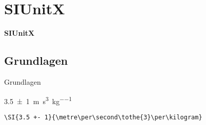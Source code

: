 \documentclass["WS\space 16-17\space -\space LaTeX-Kurs\space -\space Praesentation\space -\space 3.tex"]{subfiles}
\begin{document}
\section{SIUnitX}
\begin{frame}[c]
	\begin{center}
		\LARGE \textbf{SIUnitX}
	\end{center}
\end{frame}
\subsection{Grundlagen}
\begin{frame}[c]
	\begin{center}
		\large Grundlagen
	\end{center}
\end{frame}
\begin{frame}[fragile]
	\Ausgabe
	\begin{outputbox}
		\SI{3.5 +- 1}{\metre\per\second\cubed\per\kilogram}
	\end{outputbox}

	\pause\Code
	\begin{lstlisting}
\SI{3.5 +- 1}{\metre\per\second\tothe{3}\per\kilogram}
	\end{lstlisting}
\end{frame}
\end{document}
